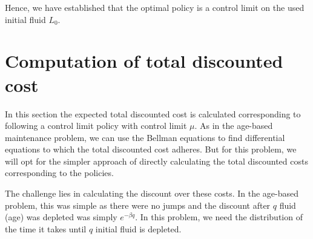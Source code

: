 \documentclass[a4paper]{thesis}
\theoremstyle{definition}
\begin{document}
Hence, we have established that the optimal policy is a control limit on the used initial fluid $L_0$. \section{Computation of total discounted cost}
In this section the expected total discounted cost is calculated corresponding to following a control limit policy with control limit $\mu$.
As in the age-based maintenance problem, we can use the Bellman equations to find differential equations to which the total discounted cost adheres.
But for this problem, we will opt for the simpler approach of directly calculating the total discounted costs corresponding to the policies.

The challenge lies in calculating the discount over these costs.
In the age-based problem, this was simple as there were no jumps and the discount after $q$ fluid (age) was depleted was simply $e^{-\beta q}$.
In this problem, we need the distribution of the time it takes until $q$ initial fluid is depleted.
\end{document}
